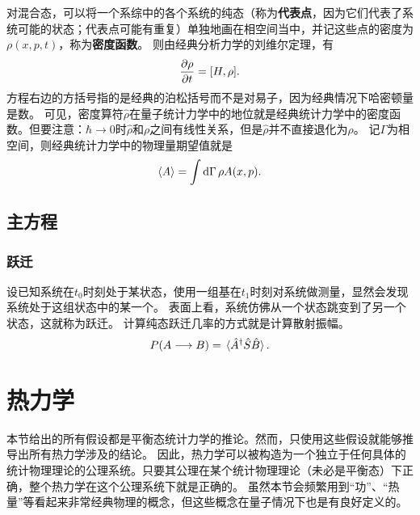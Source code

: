 \documentclass[hyperref, UTF8, a4paper]{ctexart}
\begin{document}
对混合态，可以将一个系综中的各个系统的纯态（称为\textbf{代表点}，因为它们代表了系统可能的状态；代表点可能有重复）单独地画在相空间当中，并记这些点的密度为$\rho(x, p, t)$，称为\textbf{密度函数}。
则由经典分析力学的刘维尔定理，有
\begin{equation}
    \pdv{\rho}{t} = [H, \rho].
\end{equation}
方程右边的方括号指的是经典的泊松括号而不是对易子，因为经典情况下哈密顿量是数。
可见，密度算符$\hat{\rho}$在量子统计力学中的地位就是经典统计力学中的密度函数。但要注意：$\hbar\to 0$时$\hat{\rho}$和$\rho$之间有线性关系，但是$\hat{\rho}$并不直接退化为$\rho$。
记$\Gamma$为相空间，则经典统计力学中的物理量期望值就是
\begin{equation}
    \expval{A} = \int \dd{\Gamma} \rho A(x, p).
\end{equation}

\subsection{主方程}


\subsubsection{跃迁}

设已知系统在$t_0$时刻处于某状态，使用一组基在$t_1$时刻对系统做测量，显然会发现系统处于这组状态中的某一个。
表面上看，系统仿佛从一个状态跳变到了另一个状态，这就称为跃迁。
计算纯态跃迁几率的方式就是计算散射振幅。
\begin{equation}
    P(A \longrightarrow B) = \expval*{\hat{A}^\dagger \hat{S} \hat{B}}.
\end{equation}

\section{热力学}

本节给出的所有假设都是平衡态统计力学的推论。然而，只使用这些假设就能够推导出所有热力学涉及的结论。
因此，热力学可以被构造为一个独立于任何具体的统计物理理论的公理系统。只要其公理在某个统计物理理论（未必是平衡态）下正确，整个热力学在这个公理系统下就是正确的。
虽然本节会频繁用到“功”、“热量”等看起来非常经典物理的概念，但这些概念在量子情况下也是有良好定义的。
\end{document}
